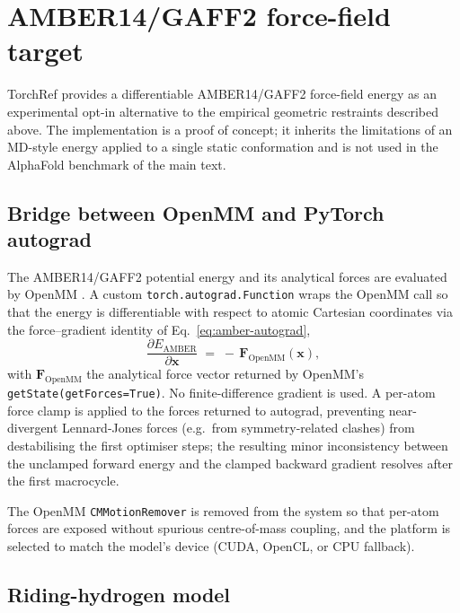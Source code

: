 \documentclass{iucrjournals}
\begin{document}
\section{AMBER14/GAFF2 force-field target}\label{sec:amber}

TorchRef provides a differentiable AMBER14/GAFF2 force-field
\cite{maier_ff14sb_2015, wang_gaff_2004} energy as an experimental opt-in
alternative to the empirical geometric restraints described above.  The
implementation is a proof of concept; it inherits the limitations of an
MD-style energy applied to a single static conformation and is not used in
the AlphaFold benchmark of the main text.

\subsection{Bridge between OpenMM and PyTorch autograd}

The AMBER14/GAFF2 potential energy and its analytical forces are
evaluated by OpenMM \cite{eastman_openmm_2017}.  A custom
\texttt{torch.autograd.Function} wraps the OpenMM call so that the energy
is differentiable with respect to atomic Cartesian coordinates via the
force--gradient identity of Eq.~\ref{eq:amber-autograd},
%
\begin{equation}
  \frac{\partial E_\mathrm{AMBER}}{\partial \mathbf{x}}
  \;=\; -\,\mathbf{F}_\mathrm{OpenMM}(\mathbf{x}),
  \label{eq:amber-autograd}
\end{equation}
%
with $\mathbf{F}_\mathrm{OpenMM}$ the analytical force vector returned by
OpenMM's \texttt{getState(getForces=True)}.  No finite-difference gradient
is used.  A per-atom force clamp is applied to the forces returned to
autograd, preventing near-divergent Lennard-Jones forces (e.g.\ from
symmetry-related clashes) from destabilising the first optimiser steps; the
resulting minor inconsistency between the unclamped forward energy and the
clamped backward gradient resolves after the first macrocycle.

The OpenMM \texttt{CMMotionRemover} is removed from the system so that
per-atom forces are exposed without spurious centre-of-mass coupling, and
the platform is selected to match the model's device (CUDA, OpenCL, or
CPU fallback).

\subsection{Riding-hydrogen model}\label{sec:amber-rideh}
\end{document}
